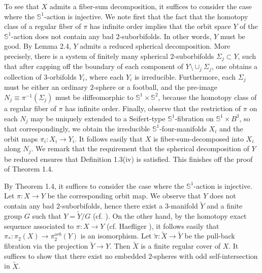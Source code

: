 \documentclass[11pt]{amsart}
\theoremstyle{plain}
\numberwithin{theorem}{section}
\theoremstyle{definition}
\begin{document}
To see that $X$ admits a fiber-sum decomposition, it suffices to consider the case where
the ${{\mathbb S}}^1$-action is injective. We note first that the fact that the homotopy class 
of a regular fiber of $\pi$ has infinite order implies that the orbit space $Y$ of the ${{\mathbb S}}^1$-action
does not contain any bad $2$-suborbifolds. In other words, $Y$ must be good. By Lemma 2.4, 
$Y$ admits a reduced spherical decomposition. More precisely, there is a system of finitely 
many spherical $2$-suborbifolds $\Sigma_j\subset Y$, such that after capping off the 
boundary of each component of $Y\setminus \cup_j \Sigma_j$, one obtains a collection 
of $3$-orbifolds $Y_i$,  where each $Y_i$ is irreducible. Furthermore, each $\Sigma_j$ 
must be either an ordinary $2$-sphere or a football, and the pre-image 
$N_j\equiv \pi^{-1}(\Sigma_j)$ must be diffeomorphic to ${{\mathbb S}}^1\times {{\mathbb S}}^2$, because the 
homotopy class of a regular fiber of $\pi$ has infinite order. Finally, observe that the restriction
of $\pi$ on each $N_j$ may be uniquely extended to a Seifert-type ${{\mathbb S}}^1$-fibration on 
${{\mathbb S}}^1\times B^3$, so that correspondingly, we obtain the irreducible ${{\mathbb S}}^1$-four-manifolds 
$X_i$ and the orbit maps $\pi_i: X_i\rightarrow Y_i$. It follows easily that $X$ is 
fiber-sum-decomposed into $X_i$ along $N_j$. We remark that the requirement that the spherical decomposition of $Y$ be reduced ensures that Definition 1.3(iv) is satisfied. This finishes 
off the proof of Theorem 1.4.

\vspace{3mm}


\vspace{3mm}

By Theorem 1.4, it suffices to consider the case where the ${{\mathbb S}}^1$-action is injective.
Let $\pi:X\rightarrow Y$ be the corresponding orbit map. We observe that 
$Y$ does not contain any bad $2$-suborbifolds, hence there exist a $3$-manifold $\tilde{Y}$ 
and a finite group $G$ such that $Y=\tilde{Y}/G$ (cf. \cite{BLP,MM}). On the other hand, by the 
homotopy exact sequence associated to $\pi:X\rightarrow Y$ (cf. Haefliger \cite{Hae2}), it follows easily that $\pi_\ast: \pi_2(X)\rightarrow \pi_2^{orb}(Y)$ is an isomorphism.  
Let $\tilde{\pi}: \tilde{X}\rightarrow \tilde{Y}$
be the pull-back fibration via the projection $\tilde{Y}\rightarrow Y$. Then $\tilde{X}$ is a finite
regular cover of $X$. It suffices to show that there exist no
embedded $2$-spheres with odd self-intersection in $\tilde{X}$. 
\end{document}
